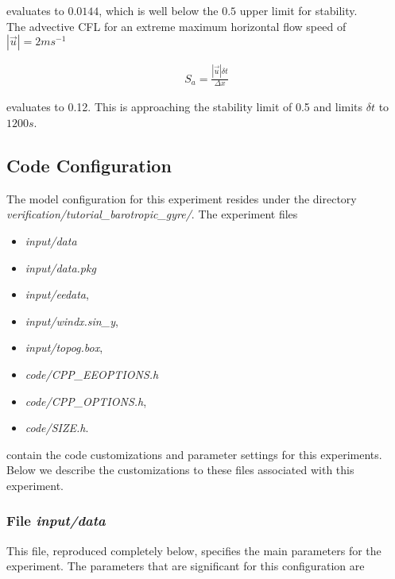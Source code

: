 \noindent evaluates to $0.0144$, which is well below the $0.5$ upper 
limit for stability.
\\

\noindent The advective CFL \cite{adcroft:95} for an extreme maximum 
horizontal flow speed of $ | \vec{u} | = 2 ms^{-1}$

\begin{eqnarray}
\label{EQ:eg-baro-cfl_stability}
S_{a} = \frac{| \vec{u} | \delta t}{ \Delta x}
\end{eqnarray}

\noindent evaluates to 0.12. This is approaching the stability limit
of 0.5 and limits $\delta t$ to $1200s$.

\subsection{Code Configuration}
\label{www:tutorials}
\label{SEC:eg-baro-code_config}

The model configuration for this experiment resides under the 
directory {\it verification/tutorial\_barotropic\_gyre/}.  
The experiment files 
\begin{itemize}
\item {\it input/data}
\item {\it input/data.pkg}
\item {\it input/eedata},
\item {\it input/windx.sin\_y},
\item {\it input/topog.box},
\item {\it code/CPP\_EEOPTIONS.h}
\item {\it code/CPP\_OPTIONS.h},
\item {\it code/SIZE.h}. 
\end{itemize}
contain the code customizations and parameter settings for this 
experiments. Below we describe the customizations
to these files associated with this experiment.

\subsubsection{File {\it input/data}}
\label{www:tutorials}

This file, reproduced completely below, specifies the main parameters 
for the experiment. The parameters that are significant for this configuration
are

